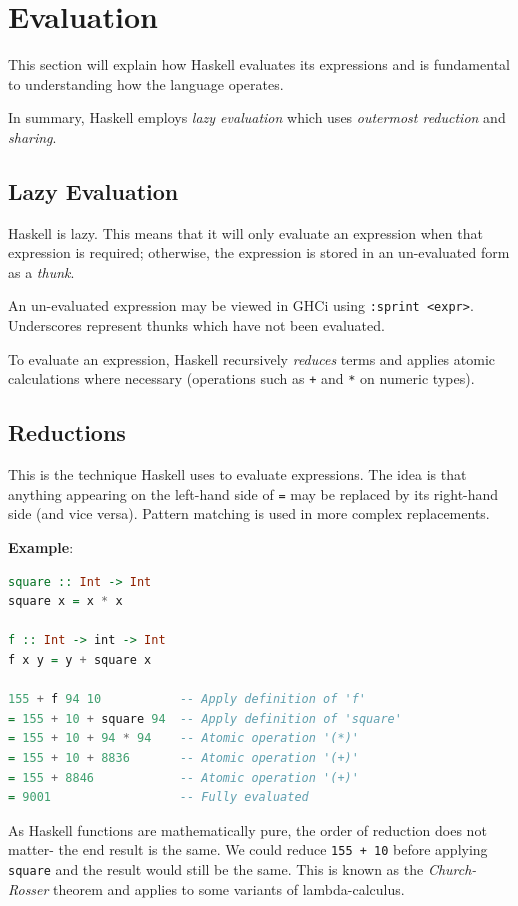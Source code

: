 \section{Evaluation}

This section will explain how Haskell evaluates its expressions and is fundamental to understanding how the language operates.

In summary, Haskell employs \textit{lazy evaluation} which uses \textit{outermost reduction} and \textit{sharing}.

\subsection{Lazy Evaluation}
Haskell is lazy. This means that it will only evaluate an expression when that expression is required; otherwise, the expression is stored in an un-evaluated form as a \textit{thunk}.

An un-evaluated expression may be viewed in GHCi using \texttt{:sprint <expr>}. Underscores represent thunks which have not been evaluated.

To evaluate an expression, Haskell recursively \textit{reduces} terms and applies atomic calculations where necessary (operations such as \texttt{+} and \texttt{*} on numeric types).

\subsection{Reductions}
This is the technique Haskell uses to evaluate expressions. The idea is that anything appearing on the left-hand side of \texttt{=} may be replaced by its right-hand side (and vice versa). Pattern matching is used in more complex replacements.

\textbf{Example}:
\begin{lstlisting}[language=haskell]
square :: Int -> Int
square x = x * x

f :: Int -> int -> Int
f x y = y + square x

155 + f 94 10           -- Apply definition of 'f'
= 155 + 10 + square 94  -- Apply definition of 'square'
= 155 + 10 + 94 * 94    -- Atomic operation '(*)'
= 155 + 10 + 8836       -- Atomic operation '(+)'
= 155 + 8846            -- Atomic operation '(+)'
= 9001                  -- Fully evaluated
\end{lstlisting}

As Haskell functions are mathematically pure, the order of reduction does not matter- the end result is the same. We could reduce \texttt{155 + 10} before applying \texttt{square} and the result would still be the same.
This is known as the \textit{Church-Rosser} theorem and applies to some variants of lambda-calculus.

